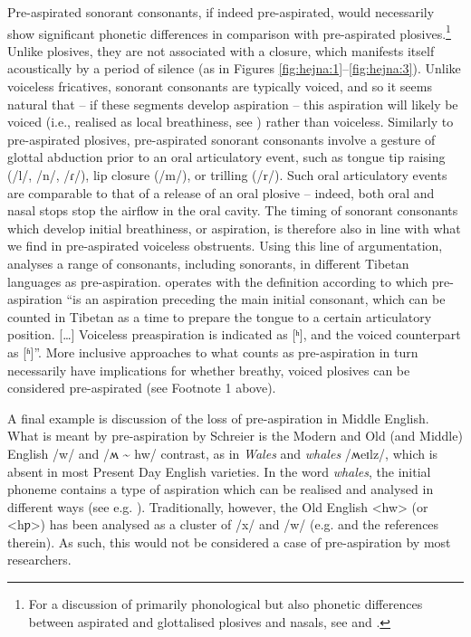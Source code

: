 \documentclass[output=paper]{langscibook}
\begin{document}
Pre-aspirated sonorant consonants, if indeed pre-aspirated, would necessarily show significant phonetic differences in comparison with pre-aspirated plosives.\footnote{For a discussion of primarily phonological but also phonetic differences between aspirated and glottalised plosives and nasals, see \citet{KehreinGolston2004} and \citet{GolstonKehrein2013}.} Unlike plosives, they are not associated with a closure, which manifests itself acoustically by a period of silence (as in Figures \ref{fig:hejna:1}--\ref{fig:hejna:3}). Unlike voiceless fricatives, sonorant consonants are typically voiced, and so it seems natural that – if these segments develop aspiration – this aspiration will likely be voiced (i.e., realised as local breathiness, see ) rather than voiceless. Similarly to pre-aspirated plosives, pre-aspirated sonorant consonants involve a gesture of glottal abduction prior to an oral articulatory event, such as tongue tip raising (/l/, /n/, /ɾ/), lip closure (/m/), or trilling (/r/). Such oral articulatory events are comparable to that of a release of an oral plosive – indeed, both oral and nasal stops stop the airflow in the oral cavity. The timing of sonorant consonants which develop initial breathiness, or aspiration, is therefore also in line with what we find in pre-aspirated voiceless obstruents. Using this line of argumentation, \citet{Suzuki2011} analyses a range of consonants, including sonorants, in different Tibetan languages as pre-aspiration. \citet[2]{Suzuki2011} operates with the definition according to which pre\hyp aspiration “is an aspiration preceding the main initial consonant, which can be counted in Tibetan as a time to prepare the tongue to a certain articulatory position. […] Voiceless preaspiration is indicated as [ʰ], and the voiced counterpart as [ʱ]”. More inclusive approaches to what counts as pre\hyp aspiration in turn necessarily have implications for whether breathy, voiced plosives can be considered pre-aspirated (see Footnote 1 above).

A final example is  discussion of the loss of pre\hyp aspiration in Middle English. What is meant by pre\hyp aspiration by Schreier is the Modern and Old (and Middle) English /w/ and /ʍ {\textasciitilde} hw/ contrast, as in \textit{Wales} and \textit{whales} /ʍeɪlz/, which is absent in most Present Day English varieties. In the word \textit{whales}, the initial phoneme contains a type of aspiration which can be realised and analysed in different ways (see e.g. \citealt{Kolísková2017, LawsonStuart-Smith1999}). Traditionally, however, the Old English <hw> (or <hƿ>) has been analysed as a cluster of /x/ and /w/ (e.g. \citealt{LassLaing2016} and the references therein). As such, this would not be considered a case of pre\hyp aspiration by most researchers.
\end{document}
